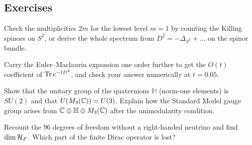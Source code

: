 \subsection*{Exercises}
\begin{exercise}\label{ex:ncgcomp:1}
Check the multiplicities $2m$ for the lowest level $m=1$ by counting the Killing spinors on $S^2$, or derive the whole spectrum from $D^2=-\Delta_{S^2}+\ldots$ on the spinor bundle.
\end{exercise}
\begin{exercise}\label{ex:ncgcomp:2}
Carry the Euler--Maclaurin expansion one order further to get the $O(t)$ coefficient of $\operatorname{Tr} e^{-tD^2}$, and check your answer numerically at $t=0.05$.
\end{exercise}
\begin{exercise}\label{ex:ncgcomp:3}
Show that the unitary group of the quaternions $\mathbb H$ (norm-one elements) is $SU(2)$ and that $U(M_3(\mathbb{C}))=U(3)$. Explain how the Standard Model gauge group arises from $\mathbb{C}\oplus\mathbb H\oplus M_3(\mathbb{C})$ after the unimodularity condition.
\end{exercise}
\begin{exercise}\label{ex:ncgcomp:4}
Recount the 96 degrees of freedom without a right-handed neutrino and find $\dim\mathcal{H}_F$. Which part of the finite Dirac operator is lost?
\end{exercise}
